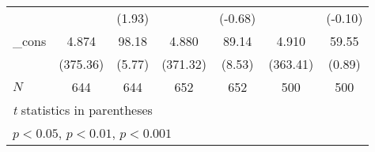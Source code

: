 {\begin{tabular}{l*{6}{c}}
            &                     &      (1.93)         &                     &     (-0.68)         &                     &     (-0.10)         \\
[1em]
\_cons      &       4.874\sym{***}&       98.18\sym{***}&       4.880\sym{***}&       89.14\sym{***}&       4.910\sym{***}&       59.55         \\
            &    (375.36)         &      (5.77)         &    (371.32)         &      (8.53)         &    (363.41)         &      (0.89)         \\
\hline
\(N\)       &         644         &         644         &         652         &         652         &         500         &         500         \\
\hline\hline
\multicolumn{7}{l}{\footnotesize \textit{t} statistics in parentheses}\\
\multicolumn{7}{l}{\footnotesize \sym{*} \(p<0.05\), \sym{**} \(p<0.01\), \sym{***} \(p<0.001\)}\\
\end{tabular}
}
